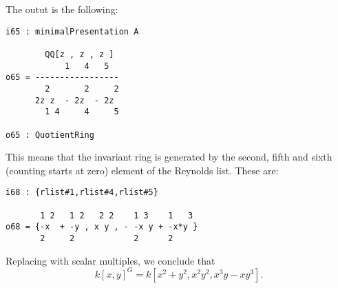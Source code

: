 \documentclass[11pt, english]{article}
\begin{document}
The outut is the following:
\begin{verbatim}
i65 : minimalPresentation A

        QQ[z , z , z ]
            1   4   5
o65 = -----------------
        2       2     2
      2z z  - 2z  - 2z
        1 4     4     5

o65 : QuotientRing
\end{verbatim}

This means that the invariant ring is generated by the second, fifth and sixth (counting starts at zero) element of the Reynolds list. These are:

\begin{verbatim}
i68 : {rlist#1,rlist#4,rlist#5}

       1 2   1 2   2 2    1 3    1   3
o68 = {-x  + -y , x y , - -x y + -x*y }
       2     2            2      2
\end{verbatim}

Replacing with scalar multiples, we conclude that 
$$
k[x,y]^G = k[x^2+y^2, x^2 y^2, x^3y - xy^3].
$$




\end{document}
